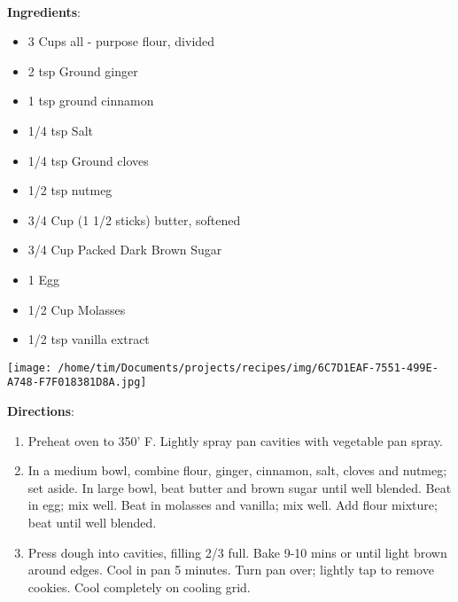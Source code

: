 \documentclass[11pt, twoside, openany]{book}
\begin{document}
 \label{gingerbread-cookies}\hfill\textit{}\\
\begin{minipage}[t]{0.8\linewidth}
\textbf{Ingredients}:\vspace{-3mm}
\begin{multicols}{2}
\begin{itemize}\setlength\itemsep{-1mm}
\item 3 Cups all - purpose flour, divided
\item 2 tsp Ground ginger
\item 1 tsp ground cinnamon
\item 1/4 tsp Salt
\item 1/4 tsp Ground cloves
\item 1/2 tsp nutmeg
\item 3/4 Cup (1 1/2 sticks) butter, softened
\item 3/4 Cup Packed Dark Brown Sugar
\item 1 Egg
\item 1/2 Cup Molasses
\item 1/2 tsp vanilla extract
\end{itemize}
\end{multicols}
\end{minipage}
\begin{minipage}[t]{0.2\linewidth}
\centering \strut\vspace*{-\baselineskip}\newline
\texttt{[image: /home/tim/Documents/projects/recipes/img/6C7D1EAF-7551-499E-A748-F7F018381D8A.jpg]}\\
\end{minipage}\vspace{3mm}
\textbf{Directions}:
\vspace{-3mm}\begin{enumerate}\setlength\itemsep{-1mm}
\item Preheat oven to 350' F. Lightly spray pan cavities with vegetable pan spray.
\item In a medium bowl, combine flour, ginger, cinnamon, salt, cloves and nutmeg; set aside. In large bowl, beat butter and brown sugar until well blended. Beat in egg; mix well. Beat in molasses and vanilla; mix well. Add flour mixture; beat until well blended.
\item Press dough into cavities, filling 2/3 full. Bake 9-10 mins or until light brown around edges. Cool in pan 5 minutes. Turn pan over; lightly tap to remove cookies. Cool completely on cooling grid. 
\end{enumerate}
\end{document}
